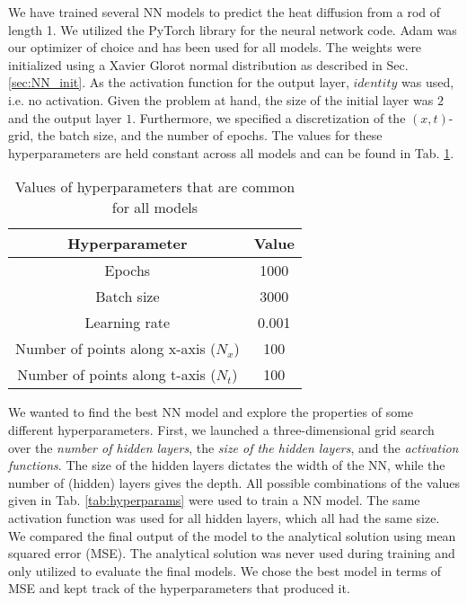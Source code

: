 We have trained several NN models to predict the heat diffusion from a rod of length 1.
We utilized the PyTorch library \cite{Ansel_PyTorch_2_Faster_2024} for the neural network code. 
Adam was our optimizer of choice and has been used for all models. 
The weights were initialized using a Xavier Glorot normal distribution as described in Sec. \ref{sec:NN_init}. 
As the activation function for the output layer, $identity$ was used, i.e. no activation. 
Given the problem at hand, the size of the initial layer was $2$ and the output layer $1$. 
Furthermore, we specified a discretization of the $(x,t)$-grid, the batch size, and the number of epochs. 
The values for these hyperparameters are held constant across all models and can be found in Tab. \ref{tab:valuesfornn}. 

\begin{table}[h!]
    \centering
    \begin{tabular}{|c|c|}
    \hline
        \textbf{Hyperparameter} & \textbf{Value}  \\ \hline
        Epochs & 1000  \\ \hline
        Batch size & 3000 \\\hline
        Learning rate & 0.001 \\ \hline
        Number of points along x-axis ($N_x$) & 100 \\ \hline
        Number of points along t-axis ($N_t$) & 100 \\ \hline
    \end{tabular}
    \caption{Values of hyperparameters that are common for all models}
    \label{tab:valuesfornn}
\end{table}


We wanted to find the best NN model and explore the properties of some different hyperparameters. 
First, we launched a three-dimensional grid search over the \textit{number of hidden layers}, the \textit{size of the hidden layers}, and the \textit{activation functions}. 
The size of the hidden layers dictates the width of the NN, while the number of (hidden) layers gives the depth. 
All possible combinations of the values given in Tab. \ref{tab:hyperparams} were used to train a NN model. 
The same activation function was used for all hidden layers, which all had the same size. 
We compared the final output of the model to the analytical solution using mean squared error (MSE). 
The analytical solution was never used during training and only utilized to evaluate the final models. 
We chose the best model in terms of MSE and kept track of the hyperparameters that produced it. 

